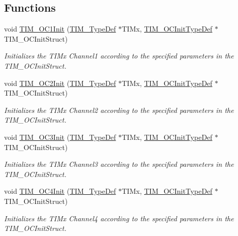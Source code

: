 \subsection*{Functions}
\begin{DoxyCompactItemize}
\item 
void \hyperlink{group___t_i_m___group2_gafcdb6ff00158862aef7fed5e7a554a3e}{T\+I\+M\+\_\+\+O\+C1\+Init} (\hyperlink{struct_t_i_m___type_def}{T\+I\+M\+\_\+\+Type\+Def} $\ast$T\+I\+Mx, \hyperlink{struct_t_i_m___o_c_init_type_def}{T\+I\+M\+\_\+\+O\+C\+Init\+Type\+Def} $\ast$T\+I\+M\+\_\+\+O\+C\+Init\+Struct)
\begin{DoxyCompactList}\small\item\em Initializes the T\+I\+Mx Channel1 according to the specified parameters in the T\+I\+M\+\_\+\+O\+C\+Init\+Struct. \end{DoxyCompactList}\item 
void \hyperlink{group___t_i_m___group2_ga2017455121d910d6ff63ac6f219842c5}{T\+I\+M\+\_\+\+O\+C2\+Init} (\hyperlink{struct_t_i_m___type_def}{T\+I\+M\+\_\+\+Type\+Def} $\ast$T\+I\+Mx, \hyperlink{struct_t_i_m___o_c_init_type_def}{T\+I\+M\+\_\+\+O\+C\+Init\+Type\+Def} $\ast$T\+I\+M\+\_\+\+O\+C\+Init\+Struct)
\begin{DoxyCompactList}\small\item\em Initializes the T\+I\+Mx Channel2 according to the specified parameters in the T\+I\+M\+\_\+\+O\+C\+Init\+Struct. \end{DoxyCompactList}\item 
void \hyperlink{group___t_i_m___group2_ga90d4a358d4e6d4c5ed17dc1d6beb5f30}{T\+I\+M\+\_\+\+O\+C3\+Init} (\hyperlink{struct_t_i_m___type_def}{T\+I\+M\+\_\+\+Type\+Def} $\ast$T\+I\+Mx, \hyperlink{struct_t_i_m___o_c_init_type_def}{T\+I\+M\+\_\+\+O\+C\+Init\+Type\+Def} $\ast$T\+I\+M\+\_\+\+O\+C\+Init\+Struct)
\begin{DoxyCompactList}\small\item\em Initializes the T\+I\+Mx Channel3 according to the specified parameters in the T\+I\+M\+\_\+\+O\+C\+Init\+Struct. \end{DoxyCompactList}\item 
void \hyperlink{group___t_i_m___group2_ga64571ebbb58cac39a9e760050175f11c}{T\+I\+M\+\_\+\+O\+C4\+Init} (\hyperlink{struct_t_i_m___type_def}{T\+I\+M\+\_\+\+Type\+Def} $\ast$T\+I\+Mx, \hyperlink{struct_t_i_m___o_c_init_type_def}{T\+I\+M\+\_\+\+O\+C\+Init\+Type\+Def} $\ast$T\+I\+M\+\_\+\+O\+C\+Init\+Struct)
\begin{DoxyCompactList}\small\item\em Initializes the T\+I\+Mx Channel4 according to the specified parameters in the T\+I\+M\+\_\+\+O\+C\+Init\+Struct. \end{DoxyCompactList}\item 

\end{DoxyCompactItemize}
